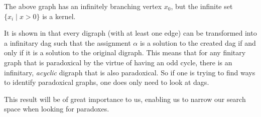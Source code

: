 The above graph has an infinitely branching vertex $x_0$, but the infinite set $\{x_i \;|\; x > 0\}$ is a kernel.

It is shown in \cite{cook} that every digraph (with at least one edge) can be transformed into a infinitary dag such that the assignment $\alpha$ is a solution to the created dag if and only if it is a solution to the original digraph.
This means that for any finitary graph that is paradoxical by the virtue of having an odd cycle, there is an infinitary, \textit{acyclic} digraph that is also paradoxical.
So if one is trying to find ways to identify paradoxical graphs, one does only need to look at dags.

This result will be of great importance to us, enabling us to narrow our search space when looking for paradoxes.

